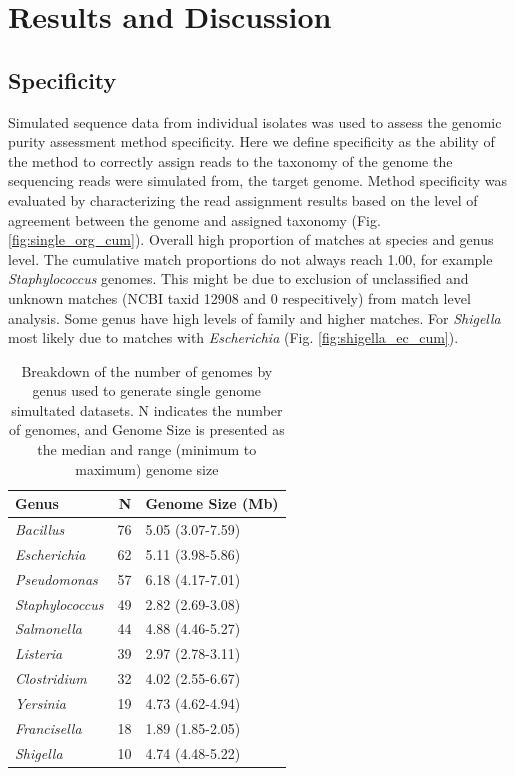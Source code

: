 \documentclass[fleqn,10pt,lineno]{wlpeerj}\usepackage[]{graphicx}\usepackage[]{color}
\begin{document}
\section*{Results and Discussion}

\subsection*{Specificity}

Simulated sequence data from individual isolates was used to assess the genomic purity assessment method specificity.  
Here we define specificity as the ability of the method to correctly assign reads to the taxonomy of the genome the sequencing reads were simulated from, the target genome. 
Method specificity was evaluated by characterizing the read assignment results based on the level of agreement between the genome and assigned taxonomy (Fig. \ref{fig:single_org_cum}). 
Overall high proportion of matches at species and genus level. 
The cumulative match proportions do not always reach 1.00, for example \textit{Staphylococcus} genomes. 
This might be due to exclusion of unclassified and unknown matches (NCBI taxid 12908 and 0 respecitively) from match level analysis. 
Some genus have high levels of family and higher matches. 
For \textit{Shigella} most likely due to matches with \textit{Escherichia} (Fig. \ref{fig:shigella_ec_cum}). 

\begin{table}[ht]
\centering
\begin{tabular}{lrl}
  \hline
Genus & N & Genome Size (Mb) \\ 
  \hline
\textit{Bacillus} &  76 & 5.05 (3.07-7.59) \\ 
  \textit{Escherichia} &  62 & 5.11 (3.98-5.86) \\ 
  \textit{Pseudomonas} &  57 & 6.18 (4.17-7.01) \\ 
  \textit{Staphylococcus} &  49 & 2.82 (2.69-3.08) \\ 
  \textit{Salmonella} &  44 & 4.88 (4.46-5.27) \\ 
  \textit{Listeria} &  39 & 2.97 (2.78-3.11) \\ 
  \textit{Clostridium} &  32 & 4.02 (2.55-6.67) \\ 
  \textit{Yersinia} &  19 & 4.73 (4.62-4.94) \\ 
  \textit{Francisella} &  18 & 1.89 (1.85-2.05) \\ 
  \textit{Shigella} &  10 & 4.74 (4.48-5.22) \\ 
   \hline
\end{tabular}
\caption{Breakdown of the number of genomes by genus used to generate single genome simultated datasets. N indicates the number of genomes, and Genome Size is presented as the median and range (minimum to maximum) genome size} 
\label{tab:single_org}
\end{table}
\end{document}
